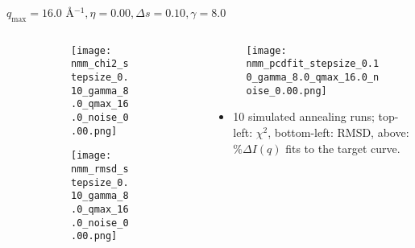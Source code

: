 \documentclass{beamer}
\begin{document}
\begin{frame}{$ q_{\textrm{max}}=16.0 $ \AA $^{-1}, \eta=0.00, \Delta s=0.10, \gamma=8.0$}
	\begin{columns}
		\begin{column}{.5\textwidth}
			\begin{figure}[H]
			\centering
			\begin{subfigure}[b]{\textwidth}
				\centering
				\texttt{[image: nmm\_chi2\_stepsize\_0.10\_gamma\_8.0\_qmax\_16.0\_noise\_0.00.png]}
				\label{fig:}
			\end{subfigure}
			\begin{subfigure}[b]{\textwidth}
				\centering
				\texttt{[image: nmm\_rmsd\_stepsize\_0.10\_gamma\_8.0\_qmax\_16.0\_noise\_0.00.png]}
				\label{fig:}
			\end{subfigure}
			\end{figure}
		\end{column}
		\begin{column}{.5\textwidth}
			\begin{figure}[H]
				\centering
				\texttt{[image: nmm\_pcdfit\_stepsize\_0.10\_gamma\_8.0\_qmax\_16.0\_noise\_0.00.png]}
				\label{fig:}
			\end{figure}
			\begin{itemize}
				\item 10 simulated annealing runs; top-left: $\chi^2$, bottom-left: RMSD, above: $\%\Delta I(q)$ fits to the target curve.
			\end{itemize}
		\end{column}
	\end{columns}
\end{frame}
 
\end{document}
